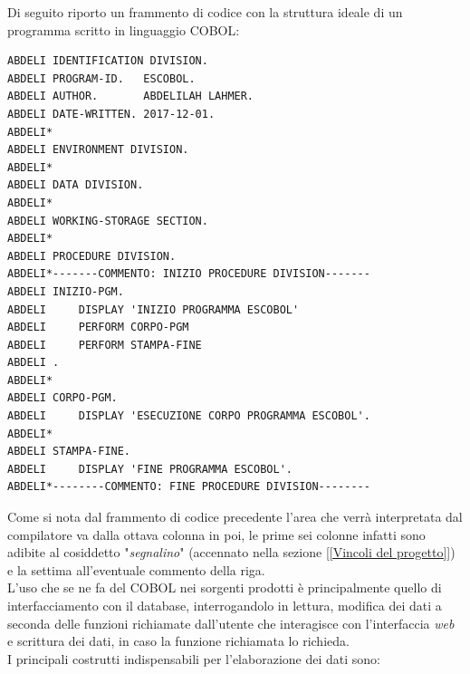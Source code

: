 Di seguito riporto un frammento di codice con la struttura ideale di un programma scritto in linguaggio COBOL:\\

\begin{lstlisting}[language=cobol]
ABDELI IDENTIFICATION DIVISION.
ABDELI PROGRAM-ID.   ESCOBOL.
ABDELI AUTHOR.       ABDELILAH LAHMER.
ABDELI DATE-WRITTEN. 2017-12-01.
ABDELI*
ABDELI ENVIRONMENT DIVISION.
ABDELI*
ABDELI DATA DIVISION.
ABDELI*
ABDELI WORKING-STORAGE SECTION.                         
ABDELI*
ABDELI PROCEDURE DIVISION.
ABDELI*-------COMMENTO: INIZIO PROCEDURE DIVISION-------
ABDELI INIZIO-PGM.
ABDELI     DISPLAY 'INIZIO PROGRAMMA ESCOBOL'
ABDELI 	   PERFORM CORPO-PGM
ABDELI     PERFORM STAMPA-FINE
ABDELI .
ABDELI*
ABDELI CORPO-PGM.
ABDELI     DISPLAY 'ESECUZIONE CORPO PROGRAMMA ESCOBOL'.
ABDELI*
ABDELI STAMPA-FINE.
ABDELI     DISPLAY 'FINE PROGRAMMA ESCOBOL'.
ABDELI*--------COMMENTO: FINE PROCEDURE DIVISION--------
\end{lstlisting}
Come si nota dal frammento di codice precedente l'area che verrà interpretata dal compilatore va dalla ottava colonna in poi, le prime sei colonne infatti sono adibite al cosiddetto "\textit{segnalino}" (accennato nella sezione [\ref{Vincoli del progetto}]) e la settima all'eventuale commento della riga.\\


L'uso che se ne fa del COBOL nei sorgenti prodotti è principalmente quello di interfacciamento con il database, interrogandolo in lettura, modifica dei dati a seconda delle funzioni richiamate dall'utente che interagisce con l'interfaccia \textit{web} e scrittura dei dati, in caso la funzione richiamata lo richieda.\\

I principali costrutti indispensabili per l'elaborazione dei dati sono:

